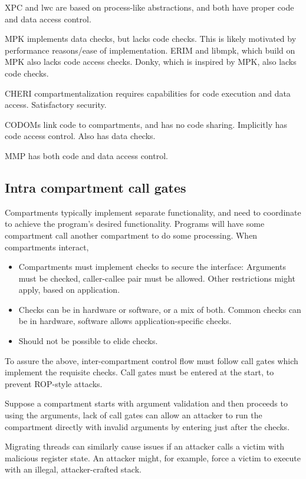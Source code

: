 XPC and lwc are based on process-like abstractions, and both have proper
code and data access control.

MPK implements data checks, but lacks code checks. 
This is likely motivated by performance reasons/ease of implementation.
ERIM and libmpk, which build on MPK also lacks code access checks.
Donky, which is inspired by MPK, also lacks code checks.

CHERI compartmentalization requires capabilities for code execution and
data access. Satisfactory security.

CODOMs link code to compartments, and has no code sharing.
Implicitly has code access control.
Also has data checks.

MMP has both code and data access control.

\subsection{Intra compartment call gates}

Compartments typically implement separate functionality, and
need to coordinate to achieve the program's desired functionality.
Programs will have some compartment call another compartment to
do some processing.
When compartments interact, 
\begin{itemize}
      \item Compartments must implement checks to secure the interface:
            Arguments must be checked, caller-callee pair must be
            allowed.
            Other restrictions might apply, based on application.
      \item Checks can be in hardware or software, or a mix of both.
            Common checks can be in hardware, software allows 
            application-specific checks.
      \item Should not be possible to elide checks.
\end{itemize}
To assure the above, inter-compartment control flow must follow call gates
which implement the requisite checks.
Call gates must be entered at the start, to prevent ROP-style attacks.

Suppose a compartment starts with argument validation and then proceeds to
using the arguments, lack of call gates can allow an attacker to run the 
compartment directly with invalid arguments by entering just after the
checks.

Migrating threads can similarly cause issues if an attacker calls a victim
with malicious register state.
An attacker might, for example, force a victim to execute with an illegal,
attacker-crafted stack.

